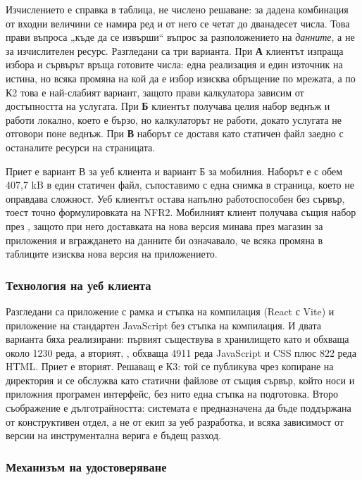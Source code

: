 Изчислението е справка в таблица, не числено решаване: за дадена комбинация от входни
величини се намира ред и от него се четат до дванадесет числа. Това прави въпроса
„къде да се извърши“ въпрос за разположението на \emph{данните}, а не за изчислителен
ресурс. Разгледани са три варианта. При \textbf{А} клиентът изпраща избора и сървърът
връща готовите числа: една реализация и един източник на истина, но всяка промяна на
кой да е избор изисква обръщение по мрежата, а по К2 това е най-слабият вариант,
защото прави калкулатора зависим от достъпността на услугата. При \textbf{Б} клиентът
получава целия набор веднъж и работи локално, което е бързо, но калкулаторът не работи,
докато услугата не отговори поне веднъж. При \textbf{В} наборът се доставя като
статичен файл заедно с останалите ресурси на страницата.

Приет е вариант В за уеб клиента и вариант Б за мобилния. Наборът е с обем 407{,}7 kB
в един статичен файл, съпоставимо с една снимка в страница, което не оправдава
сложност. Уеб клиентът остава напълно работоспособен без сървър, тоест точно
формулировката на NFR2. Мобилният клиент получава същия набор през , защото при него доставката на нова версия минава през магазин за
приложения и вграждането на данните би означавало, че всяка промяна в таблиците
изисква нова версия на приложението.

\subsubsection{Технология на уеб клиента}
\label{subsec:webtech}

Разгледани са приложение с рамка и стъпка на компилация (React с Vite) и приложение на
стандартен JavaScript без стъпка на компилация. И двата варианта бяха реализирани:
първият съществува в хранилището като  и обхваща около 1230 реда, а вторият,
, обхваща 4911 реда JavaScript и CSS плюс 822 реда HTML. Приет е
вторият. Решаващ е К3: той се публикува чрез копиране на директория и се обслужва като
статични файлове от същия сървър, който носи и приложния програмен интерфейс, без нито
една стъпка на подготовка. Второ съображение е дълготрайността: системата е
предназначена да бъде поддържана от конструктивен отдел, а не от екип за уеб
разработка, и всяка зависимост от версии на инструментална верига е бъдещ разход.

\subsubsection{Механизъм на удостоверяване}
\label{subsec:authchoice}

